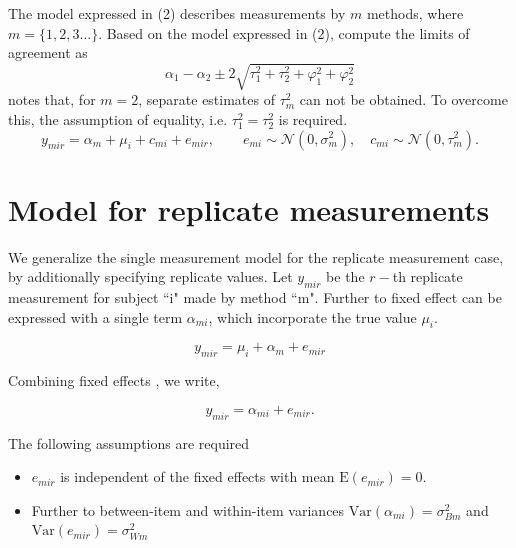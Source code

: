 \documentclass[12pt, a4paper]{report}
\theoremstyle{plain}
\theoremstyle{definition}
\theoremstyle{remark}
\begin{document}
The model expressed in (2) describes measurements by $m$ methods, where $m = \{1,2,3\ldots\}$. Based on the model expressed in (2), \citet{BXC2008} compute the limits of agreement as
\[
\alpha_1 - \alpha_2 \pm 2 \sqrt{ \tau^2_1 +  \tau^2_2 +  \varphi^2_1 +  \varphi^2_2 }
\]
\citet{BXC2008} notes that, for $m=2$, separate estimates of $\tau^2_m$ can not be obtained. To overcome this, the assumption of equality, i.e. $\tau^2_1 = \tau^2_2$ is required.
\begin{equation}
y_{mir}  = \alpha_{m} + \mu_{i} + c_{mi} + e_{mir}, \qquad  e_{mi}
\sim \mathcal{N}(0,\sigma^{2}_{m}), \quad c_{mi} \sim \mathcal{N}(0,\tau^{2}_{m}).
\end{equation}



	\section{Model for replicate measurements}
	
	We generalize the single measurement model for the replicate measurement case, by additionally specifying replicate values. Let $y_{mir}$ be the $r-$th replicate measurement for subject ``i" made by method ``m". Further to \citet{barnhart} fixed effect can be expressed with a single term $\alpha_{mi}$, which incorporate the true value $\mu_i$.
	
	\[ y_{mir} = \mu_{i} + \alpha_{m} + e_{mir}  \]
	
	Combining fixed effects \citep{barnhart}, we write,
	
	\[ y_{mir} = \alpha_{mi} + e_{mir}.\]
	
	The following assumptions are required
	
	\begin{itemize}
		\item $e_{mir}$ is independent of the fixed effects with mean $\mbox{E}(e_{mir}) = 0$.
		\item Further to \citet{barnhart} between-item and within-item variances $\mbox{Var}(\alpha_{mi}) = \sigma^2_{Bm}$ and $\mbox{Var}(e_{mir}) = \sigma^2_{Wm}$
		
	\end{itemize}
	
\end{document}
